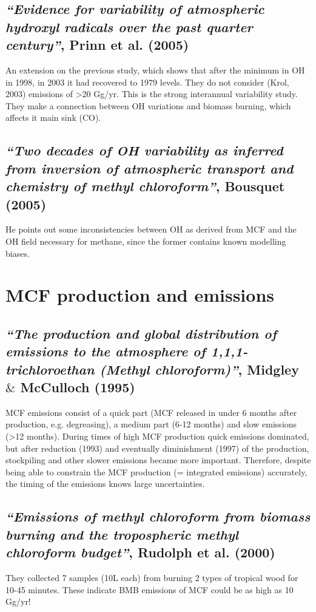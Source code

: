 \documentclass{article}
\begin{document}
\subsection{\textit{“Evidence for variability of atmospheric hydroxyl radicals over the past quarter century”}, Prinn et al. (2005)}
An extension on the previous study, which shows that after the minimum in OH in 1998, in 2003 it had recovered to 1979 levels. They do not consider (Krol, 2003) emissions of >20 Gg/yr. This is the strong interannual variability study. They make a connection between OH variations and biomass burning, which affects it main sink (CO).

\subsection{\textit{“Two decades of OH variability as inferred from inversion of atmospheric transport and chemistry of methyl chloroform”}, Bousquet (2005)}
He points out some inconsistencies between OH as derived from MCF and the OH field necessary for methane, since the former contains known modelling biases.

\section{MCF production and emissions}

\subsection{\textit{“The production and global distribution of emissions to the atmosphere of 1,1,1-trichloroethan (Methyl chloroform)”}, Midgley $\&$ McCulloch (1995)}
MCF emissions consist of a quick part (MCF released in under 6 months after production, e.g. degreasing), a medium part (6-12 months) and slow emissions (>12 months). During times of high MCF production quick emissions dominated, but after reduction (1993) and eventually diminishment (1997) of the production, stockpiling and other slower emissions became more important. Therefore, despite being able to constrain the MCF production (= integrated emissions) accurately, the timing of the emissions knows large uncertainties.

\subsection{\textit{“Emissions of methyl chloroform from biomass burning and the tropospheric methyl chloroform budget”}, Rudolph et al. (2000)}
They collected 7  samples (10L each) from burning 2 types of tropical wood for 10-45 minutes. These indicate BMB emissions of MCF could be as high as 10 Gg/yr!
\end{document}
